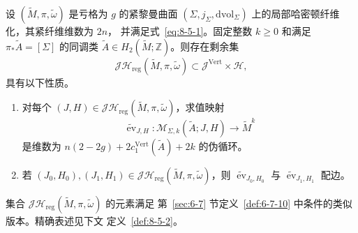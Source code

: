 \begin{theorem}\label{thm:8-5-1}
设 $(\widetilde M,\pi,\widetilde\omega)$ 是亏格为 $g$ 的紧黎曼曲面
$(\Sigma,j_\Sigma,\mathrm{dvol}_\Sigma)$ 上的局部哈密顿纤维化，其紧纤维维数为 $2n$，
并满足式~\eqref{eq:8-5-1}。固定整数 $k\ge0$ 和满足
$\pi_*\widetilde A=[\Sigma]$ 的同调类
$\widetilde A\in H_2(\widetilde M;\mathbb Z)$。则存在剩余集
\[
  \mathcal J\mathcal H_{\mathrm{reg}}
  (\widetilde M,\pi,\widetilde\omega)
  \subset\mathcal J^{\mathrm{Vert}}\times\mathcal H,
\]
具有以下性质。
\begin{enumerate}[label=\textup{(\roman*)},leftmargin=3em]
\item 对每个
$(J,H)\in\mathcal J\mathcal H_{\mathrm{reg}}
(\widetilde M,\pi,\widetilde\omega)$，求值映射
\[
  \widetilde{\operatorname{ev}}_{J,H}:
  \mathcal M_{\Sigma,k}(\widetilde A;J,H)\longrightarrow\widetilde M^k
\]
是维数为
$n(2-2g)+2c_1^{\mathrm{Vert}}(\widetilde A)+2k$ 的伪循环。
\item 若
$(J_0,H_0),(J_1,H_1)\in
\mathcal J\mathcal H_{\mathrm{reg}}(\widetilde M,\pi,\widetilde\omega)$，则
$\widetilde{\operatorname{ev}}_{J_0,H_0}$ 与
$\widetilde{\operatorname{ev}}_{J_1,H_1}$ 配边。
\end{enumerate}
\end{theorem}

集合
$\mathcal J\mathcal H_{\mathrm{reg}}(\widetilde M,\pi,\widetilde\omega)$ 的元素满足
第~\ref{sec:6-7} 节定义~\ref{def:6-7-10} 中条件的类似版本。精确表述见下文
定义~\ref{def:8-5-2}。

